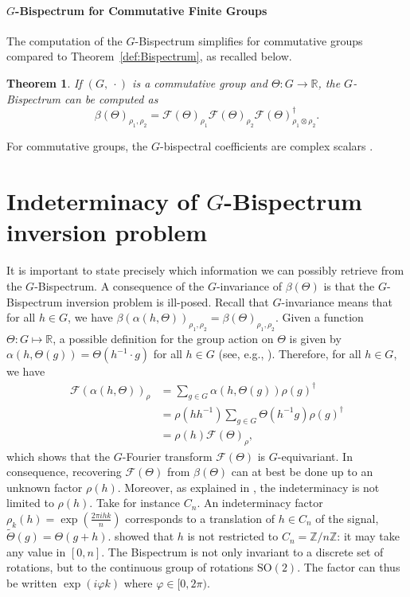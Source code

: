 \documentclass{article}
\theoremstyle{plain}
\newtheorem{theorem}{Theorem}[section]
\theoremstyle{definition}
\theoremstyle{remark}
\begin{document}
\paragraph{$G$-Bispectrum for Commutative Finite Groups}

The computation of the $G$-Bispectrum simplifies for commutative groups compared to Theorem~\ref{def:Bispectrum}, as recalled below.

\begin{theorem}{\citep{kakarala_finite_groups}}\label{thm:commutative_Bispectrum}
    If $(G,\ \cdot)$ is a commutative group and $\Theta:G\rightarrow \mathbb{R}$, the $G$-Bispectrum can be computed as
    \begin{equation}\label{eq:com_bsp}
        \beta(\Theta)_{\rho_1,\rho_2} = \mathcal{F}(\Theta)_{\rho_1}\mathcal{F}(\Theta)_{\rho_2}\mathcal{F}(\Theta)_{\rho_1\otimes\rho_2}^\dagger.
    \end{equation}
\end{theorem}
For commutative groups, the $G$-bispectral coefficients are complex scalars \citep{steinberg2011representation}.

\section{Indeterminacy of $G$-Bispectrum inversion problem}\label{sec:indeterminacy}
It is important to state precisely which information we can possibly retrieve from the $G$-Bispectrum.
A consequence of the $G$-invariance of $\beta(\Theta)$ is that the $G$-Bispectrum inversion problem is ill-posed. Recall that $G$-invariance means that for all $h\in G$, we have $\beta(\alpha(h,\Theta))_{\rho_1,\rho_2} =\beta(\Theta)_{\rho_1,\rho_2}$. Given a function $\Theta:G\mapsto\mathbb{R}$, a possible definition for the group action on $\Theta$ is given by $\alpha(h, \Theta(g)) =\Theta(h^{-1}\cdot g)$ for all $h\in G$ (see, e.g., \citep{cohenc16}). Therefore, for all $h\in G$, we have
\begin{align*}
        \mathcal{F}(\alpha(h,\Theta))_\rho &= \sum_{g\in G} \alpha(h, \Theta(g)) \rho(g)^\dagger\\
        &=\rho(hh^{-1})\sum_{g\in G} \Theta(h^{-1}g) \rho(g)^\dagger\\
        &= \rho(h) \mathcal{F}(\Theta)_\rho,
    \end{align*}
which shows that the $G$-Fourier transform $\mathcal{F}(\Theta)$ is $G$-equivariant. In consequence, recovering $\mathcal{F}(\Theta)$ from $\beta(\Theta)$ can at best be done up to an unknown factor $\rho(h)$. Moreover, as explained in \citep{kakarala_thesis, kondor08}, the indeterminacy is not limited to $\rho(h)$. Take for instance $C_n$. An indeterminacy factor $\rho_k(h) = \exp\left(\frac{2\pi i h k}{n}\right)$ corresponds to a translation of $h\in C_n$ of the signal, $\widetilde{\Theta}(g)=\Theta(g+h)$. \citep{kakarala_thesis} showed that $h$ is not restricted to $C_n=\mathbb{Z}/n\mathbb{Z}$: it may take any value in $[0,n]$. The Bispectrum is not only invariant to a discrete set of rotations, but to the continuous group of rotations $\mathrm{SO}(2)$. The factor can thus be written $\exp(i \varphi k)$ where $\varphi\in[0, 2\pi)$.
\end{document}
